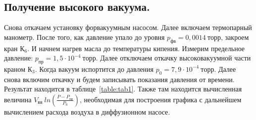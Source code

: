 \documentclass[a4paper,11pt]{article}
\begin{document}
\subsection{Получение высокого вакуума.}
Снова откачаем установку форвакуумным насосом. Далее включаем термопарный манометр. После того, как давление упало до уровня $p_{фв} = 0,0014\ торр$, закроем кран $К_{6}$. И начнем нагрев масла до температуры кипения. Измерим предельное давление: $p_{пр} = 1,5 \cdot 10^{-4}\ торр$. Далее отключаем откачку высоковакуумной части краном $К_{3}$. Когда вакуум испортится до давления $p_{0} = 7,9 \cdot 10^{-4}\ торр$. Далее снова включим откачку и будем записывать показания давления от времени. Результат находится в таблице~\ref{table:tab1}. Также там находится вычисленная величина $V_{вв}\ ln \left( \frac{P - P_{пр}}{P_{0}} \right)$, необходимая для построения графика с дальнейшем вычислением расхода воздуха в диффузионном насосе.
\end{document}
